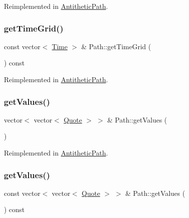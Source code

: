 Reimplemented in \hyperlink{class_antithetic_path_a7b6c87162d9c4642dda68b4f9af5f653}{Antithetic\+Path}.

\hypertarget{class_path_a774bc2169ae87142b8165c3934a9deb9}{}\label{class_path_a774bc2169ae87142b8165c3934a9deb9} 
\subsubsection{\texorpdfstring{get\+Time\+Grid()}{getTimeGrid()}}
{\footnotesize\ttfamily const vector$<$ \hyperlink{_name_def_8h_ac2d3e0ba793497bcca555c7c2cf64ff3}{Time} $>$ \& Path\+::get\+Time\+Grid (\begin{DoxyParamCaption}{ }\end{DoxyParamCaption}) const\hspace{0.3cm}{\ttfamily [virtual]}}



Reimplemented in \hyperlink{class_antithetic_path_a8986e32381ea393159a15dc2b1c0b12c}{Antithetic\+Path}.

\hypertarget{class_path_aeeb21dd5019a717cc8a36ddb0f82f427}{}\label{class_path_aeeb21dd5019a717cc8a36ddb0f82f427} 
\subsubsection{\texorpdfstring{get\+Values()}{getValues()}\hspace{0.1cm}{\footnotesize\ttfamily [1/2]}}
{\footnotesize\ttfamily vector$<$ vector$<$ \hyperlink{_name_def_8h_a642a6c5fd87319d922637de0e0bb0305}{Quote} $>$ $>$ \& Path\+::get\+Values (\begin{DoxyParamCaption}{ }\end{DoxyParamCaption})\hspace{0.3cm}{\ttfamily [virtual]}}



Reimplemented in \hyperlink{class_antithetic_path_a631294808de3c75c98563f292464a7da}{Antithetic\+Path}.

\hypertarget{class_path_a6d3469e98b5da124b51ca8a9cc2caa28}{}\label{class_path_a6d3469e98b5da124b51ca8a9cc2caa28} 
\subsubsection{\texorpdfstring{get\+Values()}{getValues()}\hspace{0.1cm}{\footnotesize\ttfamily [2/2]}}
{\footnotesize\ttfamily const vector$<$ vector$<$ \hyperlink{_name_def_8h_a642a6c5fd87319d922637de0e0bb0305}{Quote} $>$ $>$ \& Path\+::get\+Values (\begin{DoxyParamCaption}{ }\end{DoxyParamCaption}) const\hspace{0.3cm}{\ttfamily [virtual]}}



